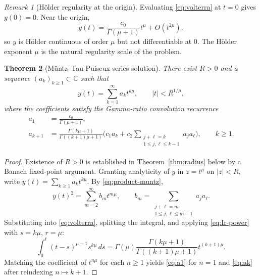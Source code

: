 \documentclass[11pt]{article}
\newtheorem{theorem}{Theorem}[section]
\theoremstyle{definition}
\theoremstyle{remark}
\newtheorem{remark}[theorem]{Remark}
\begin{document}
\begin{remark}[H\"older regularity at the origin]
\label{rem:holder}
Evaluating \eqref{eq:volterra} at $t=0$ gives $y(0)=0$. Near the origin,
\begin{equation}
y(t)=\frac{c_{0}}{\Gamma(\mu+1)}t^{\mu}+O(t^{2\mu}),
\label{eq:holder-leading}
\end{equation}
so $y$ is H\"older continuous of order $\mu$ but not differentiable at $0$. The H\"older exponent $\mu$ is the natural regularity scale of the problem.
\end{remark}

\begin{theorem}[M\"untz--Tau Puiseux series solution]
\label{thm:riccati-series}
There exist $R>0$ and a sequence $(a_{k})_{k\ge 1}\subset\mathbb{C}$ such that
\begin{equation}
y(t)=\sum_{k=1}^{\infty}a_{k}t^{k\mu},
\qquad |t|<R^{1/\mu},
\label{eq:y-series}
\end{equation}
where the coefficients satisfy the Gamma-ratio convolution recurrence
\begin{align}
a_{1}&=\frac{c_{0}}{\Gamma(\mu+1)},
\label{eq:a1}\\
a_{k+1}&=\frac{\Gamma(k\mu+1)}{\Gamma((k+1)\mu+1)}\biggl(c_{1}a_{k}+c_{2}\!\!\sum_{\substack{j+\ell=k\\ 1\le j,\ell\le k-1}}\!\!a_{j}a_{\ell}\biggr),
\qquad k\ge 1.
\label{eq:ak}
\end{align}
\end{theorem}

\begin{proof}
Existence of $R>0$ is established in Theorem~\ref{thm:radius} below by a Banach fixed-point argument. Granting analyticity of $y$ in $z=t^{\mu}$ on $|z|<R$, write $y(t)=\sum_{k\ge 1}a_{k}t^{k\mu}$. By \eqref{eq:product-muntz},
\begin{equation}
y(t)^{2}=\sum_{m=2}^{\infty}b_{m}t^{m\mu},
\qquad b_{m}=\sum_{\substack{j+\ell=m\\ 1\le j,\ell\le m-1}}a_{j}a_{\ell}.
\label{eq:y-squared}
\end{equation}
Substituting into \eqref{eq:volterra}, splitting the integral, and applying \eqref{eq:Ir-power} with $s=k\mu$, $r=\mu$:
\begin{equation}
\int_{0}^{t}(t-s)^{\mu-1}s^{k\mu}\,ds=\Gamma(\mu)\frac{\Gamma(k\mu+1)}{\Gamma((k+1)\mu+1)}t^{(k+1)\mu}.
\label{eq:beta-integral}
\end{equation}
Matching the coefficient of $t^{n\mu}$ for each $n\ge 1$ yields \eqref{eq:a1} for $n=1$ and \eqref{eq:ak} after reindexing $n\mapsto k+1$.
\end{proof}
\end{document}
